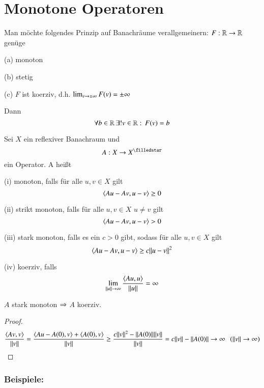 \section{Monotone Operatoren}

Man möchte folgendes Prinzip auf Banachräume verallgemeinern: $F:\mathbb{R}\rightarrow\mathbb{R}$ genüge
\begin{description}
    \item{(a)}
    monoton
    \item{(b)}
    stetig
    \item{(c)}
    $F$ ist koerziv, d.h. $\lim_{v\rightarrow \pm \infty} F(v)=\pm \infty$
\end{description}
Dann
\[
    \forall b\in \mathbb{R} \, \exists ! v\in \mathbb{R}: \, F(v)=b
\]

\begin{defi}\label{4.1}
    Sei $X$ ein reflexiver Banachraum und
    \[
        A:X\ra X^\star
    \]
    ein Operator. A heißt
    \begin{description}
        \item{(i)}
        monoton, falls für alle $u,v\in X$ gilt
        \[
            \langle Au-Av,u-v\rangle\geq 0
        \]
        \item{(ii)}
        strikt monoton, falls für alle $ u, v\in X$ $u\neq v$ gilt
        \[
            \langle Au-Av,u-v\rangle>0
        \]
        \item{(iii)}
        stark monoton, falls es ein $c >0$ gibt, sodass für alle $u,v\in X$ gilt
        \[
            \langle Au-Av,u-v\rangle\geq c\|u-v\|^2
        \]
        \item{(iv)}
        koerziv, falls
        \[
            \lim_{\|u\|\rightarrow \infty}\frac{ \langle Au,u\rangle }{\|u\|}=\infty
        \]
    \end{description}
\end{defi}

\begin{remark}
    $A$ stark monoton $\Rightarrow$ $A$ koerziv.
\end{remark}

\begin{proof}
    \[
        \frac{\langle Av,v\rangle}{\|v\|}=\frac{ \langle Au-A(0), v\rangle + \langle A(0),v\rangle }{\|v\|}
        \geq \frac{c\|v\|^2 - \|A(0)\|\|v\|}{\|v\|} = c\|v\| - \|A(0)\|\rightarrow \infty \hspace{.25cm} (\|v\|\rightarrow \infty)
    \]
\end{proof}

\subsubsection*{Beispiele:}

